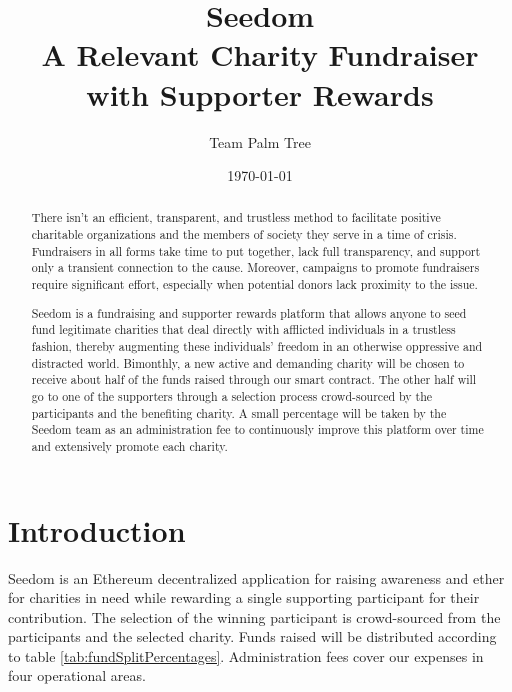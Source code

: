 \documentclass[11pt]{article}
\begin{document}
\title{%
\Huge Seedom \\[4mm]
\large A Relevant Charity Fundraiser \\[1mm]
with Supporter Rewards}
\author{Team Palm Tree}
\date{\today}
\maketitle

\begin{abstract}

There isn't an efficient, transparent, and trustless method to facilitate positive charitable organizations and the members of society they serve in a time of crisis. Fundraisers in all forms take time to put together, lack full transparency, and support only a transient connection to the cause. Moreover, campaigns to promote fundraisers require significant effort, especially when potential donors lack proximity to the issue.

Seedom is a fundraising and supporter rewards platform that allows anyone to seed fund legitimate charities that deal directly with afflicted individuals in a trustless fashion, thereby augmenting these individuals' freedom in an otherwise oppressive and distracted world. Bimonthly, a new active and demanding charity will be chosen to receive about half of the funds raised through our smart contract. The other half will go to one of the supporters through a selection process crowd-sourced by the participants and the benefiting charity. A small percentage will be taken by the Seedom team as an administration fee to continuously improve this platform over time and extensively promote each charity.

\end{abstract}
\pagebreak

\tableofcontents
\pagebreak

\section{Introduction}

Seedom is an Ethereum decentralized application for raising awareness and ether for charities in need while rewarding a single supporting participant for their contribution. The selection of the winning participant is crowd-sourced from the participants and the selected charity. Funds raised will be distributed according to table \ref{tab:fundSplitPercentages}. Administration fees cover our expenses in four operational areas.
\end{document}
